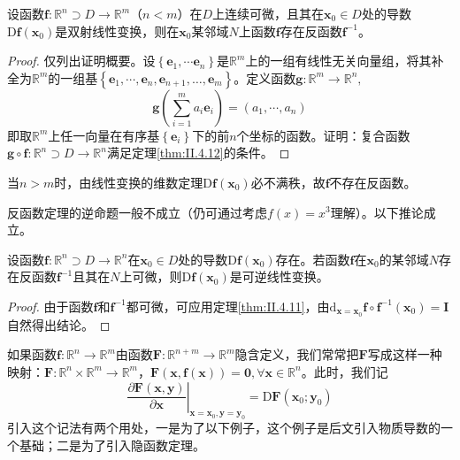 \documentclass[../main.tex]{subfiles}
\begin{document}
\begin{corollary}
    设函数$\mathbf{f}:\mathbb{R}^n\supset D\rightarrow\mathbb{R}^m$（$n<m$）在$D$上连续可微，且其在$\mathbf{x}_0\in D$处的导数$\mathrm{D}\mathbf{f}\left(\mathbf{x}_0\right)$是双射线性变换，则在$\mathbf{x}_0$某邻域$N$上函数$\mathbf{f}$存在反函数$\mathbf{f}^{-1}$。
\end{corollary}
\begin{proof}
    仅列出证明概要。设$\left\{\mathbf{e}_1,\cdots\mathbf{e}_n\right\}$是$\mathbb{R}^m$上的一组有线性无关向量组，将其补全为$\mathbb{R}^m$的一组基$\left\{\mathbf{e}_1,\cdots,\mathbf{e}_n,\mathbf{e}_{n+1},\dots,\mathbf{e}_m\right\}$。定义函数$\mathbf{g}:\mathbb{R}^m\rightarrow\mathbb{R}^n,$
    \[\mathbf{g}\left(\sum_{i=1}^m a_i\mathbf{e}_i\right)=\left(a_1,\cdots,a_n\right)\]
    即取$\mathbb{R}^m$上任一向量在有序基$\left\{\mathbf{e}_i\right\}$下的前$n$个坐标的函数。证明：复合函数$\mathbf{g}\circ\mathbf{f}:\mathbb{R}^n\supset D\rightarrow\mathbb{R}^n$满足定理\ref{thm:II.4.12}的条件。

\end{proof}

当$n>m$时，由线性变换的维数定理$\mathrm{D}\mathbf{f}\left(\mathbf{x}_0\right)$必不满秩，故$\mathbf{f}$不存在反函数。

反函数定理的逆命题一般不成立（仍可通过考虑$f\left(x\right)=x^3$理解）。以下推论成立。

\begin{corollary}
    设函数$\mathbf{f}:\mathbb{R}^n\supset D\rightarrow\mathbb{R}^n$在$\mathbf{x}_0\in D$处的导数$\mathrm{D}\mathbf{f}\left(\mathbf{x}_0\right)$存在。若函数$\mathbf{f}$在$\mathbf{x}_0$的某邻域$N$存在反函数$\mathbf{f}^{-1}$且其在$N$上可微，则$\mathrm{D}\mathbf{f}\left(\mathbf{x}_0\right)$是可逆线性变换。
\end{corollary}
\begin{proof}
    由于函数$\mathbf{f}$和$\mathbf{f}^{-1}$都可微，可应用定理\ref{thm:II.4.11}，由$\mathrm{d}_{\mathbf{x}=\mathbf{x}_0}\mathbf{f}\circ\mathbf{f}^{-1}\left(\mathbf{x}_0\right)=\mathbf{I}$自然得出结论。
\end{proof}

如果函数$\mathbf{f}:\mathbb{R}^n\rightarrow\mathbb{R}^m$由函数$\mathbf{F}:\mathbb{R}^{n+m}\rightarrow\mathbb{R}^m$隐含定义，我们常常把$\mathbf{F}$写成这样一种映射：$\mathbf{F}:\mathbb{R}^n\times\mathbb{R}^m\rightarrow\mathbb{R}^m$，$\mathbf{F}\left(\mathbf{x},\mathbf{f}\left(\mathbf{x}\right)\right)=\mathbf{0},\forall\mathbf{x}\in\mathbb{R}^n$。此时，我们记
\[\left.\frac{\partial \mathbf{F}\left(\mathbf{x},\mathbf{y}\right)}{\partial \mathbf{x}}\right|_{\mathbf{x}=\mathbf{x}_0,\mathbf{y}=\mathbf{y}_0}=
    \mathrm{D}\mathbf{F}\left(\mathbf{x}_0;\mathbf{y}_0\right)\]
引入这个记法有两个用处，一是为了以下例子，这个例子是后文引入物质导数的一个基础；二是为了引入隐函数定理。
\end{document}
